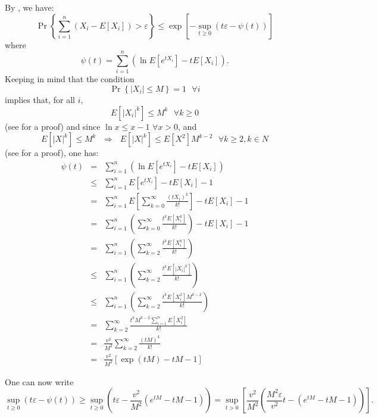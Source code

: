 \documentclass[12pt]{article}
\begin{document}
By , we have:
\[
\Pr\left\{ \sum_{i=1}^{n}\left( X_{i}-E[X_{i}]\right) >\varepsilon \right\}
\leq \exp \left[ -\sup_{t\geq 0}\left( t\varepsilon -\psi (t)\right) \right] 
\]
where
\[
\psi (t)=\sum_{i=1}^{n}\left( \ln E\left[ e^{tX_{i}}\right] -tE\left[ X_{i}%
\right] \right). 
\]
Keeping in mind that the condition
\[
\Pr\left\{ \left\vert X_{i}\right\vert \leq M\right\} =1\text{ \ }\forall i
\]
implies that, for all $i$,
\[
E[\left\vert X_{i}\right\vert ^{k}]\leq M^{k} \text{ \ }\forall k\geq 0
\]
(see  for a proof) and since $\ln x\leq x-1$ $\forall x>0$, and%
\[
E[\left\vert X\right\vert ^{k}]\leq M^{k}\text{ \ }\Longrightarrow \text{ \ }%
E\left[ \left\vert X\right\vert ^{k}\right] \leq E\left[ X^{2}\right] M^{k-2}%
\text{ \ \ \ \ \ \ \ }\forall k\geq 2,k\in N
\]
(see  for a proof), one has:
\begin{eqnarray*}
\psi (t) &=&\sum_{i=1}^{n}\left( \ln E\left[ e^{tX_{i}}\right] -tE\left[
X_{i}\right] \right) \\
&\leq &\sum_{i=1}^{n}E\left[ e^{tX_{i}}\right] -tE\left[ X_{i}\right] -1 \\
&=&\sum_{i=1}^{n}E\left[ \sum_{k=0}^{\infty }\frac{\left( tX_{i}\right) ^{k}%
}{k!}\right] -tE\left[ X_{i}\right] -1 \\
&=&\sum_{i=1}^{n}\left( \sum_{k=0}^{\infty }\frac{t^{k}E\left[ X_{i}^{k}%
\right] }{k!}\right) -tE\left[ X_{i}\right] -1 \\
&=&\sum_{i=1}^{n}\left( \sum_{k=2}^{\infty }\frac{t^{k}E\left[ X_{i}^{k}%
\right] }{k!}\right)  \\
&\leq &\sum_{i=1}^{n}\left( \sum_{k=2}^{\infty }\frac{t^{k}E\left[
\left\vert X_{i}\right\vert ^{k}\right] }{k!}\right)  \\
&\leq &\sum_{i=1}^{n}\left( \sum_{k=2}^{\infty }\frac{t^{k}E\left[ X_{i}^{2}%
\right] M^{k-2}}{k!}\right) \\
&=&\sum_{k=2}^{\infty }\frac{t^{k}M^{k-2}\sum_{i=1}^{n}E\left[ X_{i}^{2}%
\right] }{k!} \\
&=&\frac{v^{2}}{M^{2}}\sum_{k=2}^{\infty }\frac{\left( tM\right) ^{k}}{k!} \\
&=&\frac{v^{2}}{M^{2}}\left[ \exp \left( tM\right) -tM-1\right] 
\end{eqnarray*}

One can now write
\[
\sup_{t\geq 0}\left( t\varepsilon -\psi (t)\right) \geq \sup_{t\geq 0}\left(
t\varepsilon -\frac{v^{2}}{M^{2}}\left( e^{tM}-tM-1\right) \right)
=\sup_{t>0}\left[ \frac{v^{2}}{M^{2}}\left( \frac{M^{2}\varepsilon }{v^{2}}%
t-\left( e^{tM}-tM-1\right) \right) \right]. 
\]
\end{document}
